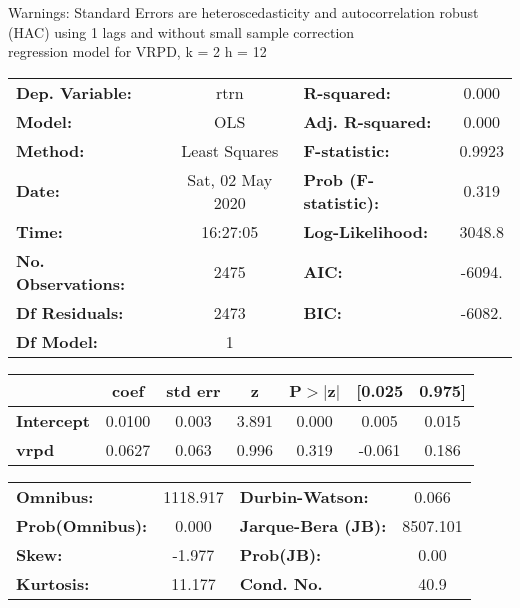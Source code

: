Warnings: \newline
 [1] Standard Errors are heteroscedasticity and autocorrelation robust (HAC) using 1 lags and without small sample correction\\ 

regression model for VRPD, k = 2 h = 12\begin{center}
\begin{tabular}{lclc}
\toprule
\textbf{Dep. Variable:}    &       rtrn       & \textbf{  R-squared:         } &     0.000   \\
\textbf{Model:}            &       OLS        & \textbf{  Adj. R-squared:    } &     0.000   \\
\textbf{Method:}           &  Least Squares   & \textbf{  F-statistic:       } &    0.9923   \\
\textbf{Date:}             & Sat, 02 May 2020 & \textbf{  Prob (F-statistic):} &    0.319    \\
\textbf{Time:}             &     16:27:05     & \textbf{  Log-Likelihood:    } &    3048.8   \\
\textbf{No. Observations:} &        2475      & \textbf{  AIC:               } &    -6094.   \\
\textbf{Df Residuals:}     &        2473      & \textbf{  BIC:               } &    -6082.   \\
\textbf{Df Model:}         &           1      & \textbf{                     } &             \\
\bottomrule
\end{tabular}
\begin{tabular}{lcccccc}
                   & \textbf{coef} & \textbf{std err} & \textbf{z} & \textbf{P$> |$z$|$} & \textbf{[0.025} & \textbf{0.975]}  \\
\midrule
\textbf{Intercept} &       0.0100  &        0.003     &     3.891  &         0.000        &        0.005    &        0.015     \\
\textbf{vrpd}      &       0.0627  &        0.063     &     0.996  &         0.319        &       -0.061    &        0.186     \\
\bottomrule
\end{tabular}
\begin{tabular}{lclc}
\textbf{Omnibus:}       & 1118.917 & \textbf{  Durbin-Watson:     } &    0.066  \\
\textbf{Prob(Omnibus):} &   0.000  & \textbf{  Jarque-Bera (JB):  } & 8507.101  \\
\textbf{Skew:}          &  -1.977  & \textbf{  Prob(JB):          } &     0.00  \\
\textbf{Kurtosis:}      &  11.177  & \textbf{  Cond. No.          } &     40.9  \\
\bottomrule
\end{tabular}
\end{center}

